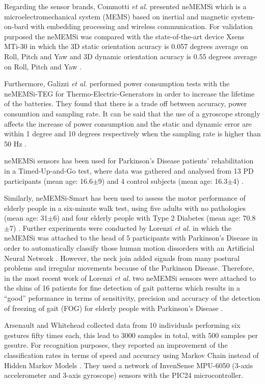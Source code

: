 \documentclass[9pt,journal,onecolumn,compsoc]{IEEEtran}
\begin{document}
Regarding the sensor brands, 
Commotti \textit{et al.} presented neMEMSi which is a microelectromechanical system (MEMS)  based on 
inertial and magnetic system-on-bard with embedding processing and wireless communication.
For validation purposed the neMEMSi was compared with the state-of-the-art device Xsens MTi-30
in which the 3D static orientation acuracy is 0.057 degrees average on Roll, Pitch and Yaw 
and 3D dynamic orientation acuracy is 0.55 degrees average on Roll, Pitch and Yaw \cite{Comotti2014}.

Furthermore, Galizzi \textit{et al.} performed power consumption tests with the 
neMEMSi-TEG for Thermo-Electric-Generators in order to increase the lifetime of the batteries.
They found that there is a trade off between accuracy, power consumtion and sampling rate.
It can be said that the use of a gyroscope strongly affects the increase of power consumption
and the static and dynamic error are within 1 degree and 10 degrees respectively 
when the sampling rate is higher than 50 Hz \cite{Galizzi2015}.

neMEMSi sensors has been used for Parkinson's Disease patients' rehabilitation 
in a Timed-Up-and-Go test, where data was gathered and analysed from 
13 PD participants (mean age: 16.6$\pm$9) and 4 control subjects (mean age: 16.3$\pm$4) \cite{Caldara2014}.

Similarly, neMEMSi-Smart has been used to assess the motor performance of elderly people
in a six-minute walk test, using five adults with no pathologies (mean age: 31$\pm$6) and four elderly people with Type 2 Diabetes 
(mean age: 70.8$\pm$7) \cite{Caldara2015}.
Further experiments were conducted by Lorenzi \textit{et al.} in which the neMEMSi was attached to the head 
of 5 participants  with Parkinson's Disease in order to 
automatically classify those human motion dissorders with an Artificial Neural Network \cite{Lorenzi2015}.
However, the neck join added signals from many postural problems
and irregular movements because of the Parkinson Disease.
Therefore, in the most recent work of Lorenzi \textit{et al.} two neMEMSi sensors were attached to the shins
of 16 patients for fine detection of gait patterns
which results in a ``good'' peformance in terms of sensitivity, precision and accuracy of 
the detection of freezing of gait (FOG) for elderly people with Parkinson's Disease  \cite{Lorenzi2016}.



Arsenault and Whitehead collected data from 10 individuals performing six gestures fifty times each,
this lead to 3000 samples in total, with 500 samples per gesutre. 
For recognition purposes, they reported an improvement of the classification rates
in terms of speed and accuracy using Markov Chain instead of Hidden Markov Models \cite{Arsenault2015_a, Arsenault2015_b}.
They used a network of InvenSense MPU-6050 (3-axis accelerometer and 3-axis gyroscope) sensors with the  PIC24 microcontroller.
  
\end{document}

